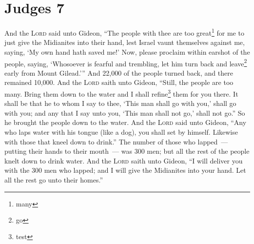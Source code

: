 \section{Judges 7}\label{Judges 7}
\begin{enumerate}[align=center]
     And the \textsc{Lord} said unto Gideon, ``The people with thee are too great\footnote{many} for me to just give the Midianites into their hand, lest Israel vaunt themselves against me, saying, `My own hand hath saved me!'%
     Now, please proclaim within earshot of the people, saying, `Whosoever is fearful and trembling, let him turn back and leave\footnote{go} early from Mount Gilead.''' And 22,000 of the people turned back, and there remained 10,000.%
     And the \textsc{Lord} saith unto Gideon, ``Still, the people are too many. Bring them down to the water and I shall refine\footnote{test} them for you there. It shall be that he to whom I say to thee, `This man shall go with you,' shall go with you; and any that I say unto you, `This man shall not go,' shall not go.''%
     So he brought the people down to the water. And the \textsc{Lord} said unto Gideon, ``Any who laps water with his tongue (like a dog), you shall set by himself. Likewise with those that kneel down to drink.''%
     The number of those who lapped~--- putting their hands to their mouth~--- was 300 men; but all the rest of the people knelt down to drink water.%
     And the \textsc{Lord} saith unto Gideon, ``I will deliver you with the 300 men who lapped; and I will give the Midianites into your hand. Let all the rest go unto their homes.''%
\end{enumerate}
